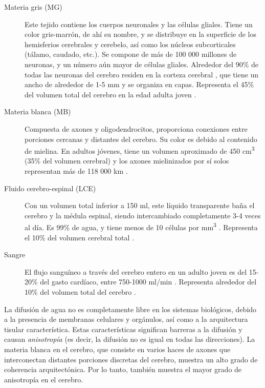 \documentclass[12pt,a5,twoside]{book}
\begin{document}
\begin{description}
\item[Materia gris (MG)] Este tejido contiene los cuerpos neuronales y las células gliales. Tiene un color gris-marrón, de ahí su nombre, y se distribuye en la superficie de los hemisferios cerebrales y cerebelo, así como los núcleos subcorticales (tálamo, caudado, etc.). Se compone de más de 100 000 millones de neuronas, y un número aún mayor de células gliales. Alrededor del 90\% de todas las neuronas del cerebro residen en la corteza cerebral \citep{Pakkenberg_1997}, que tiene un ancho de alrededor de 1-5 mm y se organiza en capas. Representa el 45\% del volumen total del cerebro en la edad adulta joven \citep{Rengachary_2004}.
\item[Materia blanca (MB)] Compuesta de axones y oligodendrocitos, proporciona conexiones entre porciones cercanas y distantes del cerebro. Su color es debido al contenido de mielina. En adultos jóvenes, tiene un volumen aproximado de 450 cm\textsuperscript{3} (35\% del volumen cerebral) y los axones mielinizados por sí solos representan más de 118 000 km \citep{Tang_1997}.
\item[Fluido cerebro-espinal (LCE)] Con un volumen total inferior a 150 ml, este líquido transparente baña el cerebro y la médula espinal, siendo intercambiado completamente 3-4 veces al día. Es 99\% de agua, y tiene menos de 10 células por mm\textsuperscript{3} \citep{Kandel_2000}. Representa el 10\% del volumen cerebral total \citep{Rengachary_2004}.
\item[Sangre] El flujo sanguíneo a través del cerebro entero en un adulto joven es del 15-20\% del gasto cardíaco, entre 750-1000 ml/min \citep{Kandel_2000}. Representa alrededor del 10\% del volumen total del cerebro \citep{Rengachary_2004}.
\end{description}

La difusión de agua no es completamente libre en los sistemas biológicos, debido a la presencia de membranas celulares y orgánulos, así como a la arquitectura tisular característica. Estas características significan barreras a la difusión y causan {\it anisotropía} (es decir, la difusión no es igual en todas las direcciones). La materia blanca en el cerebro, que consiste en varios haces de axones que interconectan distantes porciones discretas del cerebro, muestra un alto grado de coherencia arquitectónica. Por lo tanto, también muestra el mayor grado de anisotropía en el cerebro.
\end{document}
